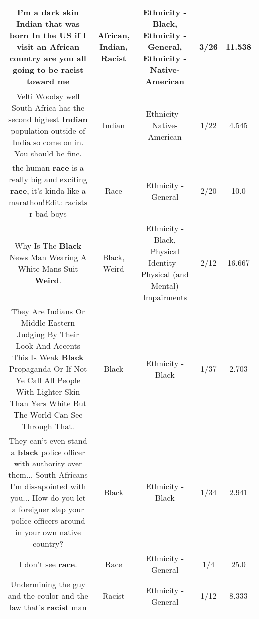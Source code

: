 \documentclass[11pt]{article}
\newlength\mylength
\begin{document}
\begin{center}
\begin{longtable}{|C{.65\mylength}|C{.30\mylength}|C{.12\mylength}|C{.12\mylength}|C{.12\mylength}|}
  \small I'm a dark skin \textbf{Indian} that was born In the US if I visit an \textbf{African} country are you all going to be \textbf{racist} toward me\normalsize   & African, Indian, Racist & Ethnicity - Black, Ethnicity - General, Ethnicity - Native-American & 3/26 & 11.538 \\  \hline
  \small Velti Woodsy well South Africa has the second highest \textbf{Indian} population outside of India so come on in. You should be fine.\normalsize   & Indian & Ethnicity - Native-American & 1/22 & 4.545 \\  \hline
  \small the human \textbf{race} is a really big and exciting \textbf{race}, it's kinda like a marathon!Edit: racists r bad boys\normalsize   & Race & Ethnicity - General & 2/20 & 10.0 \\  \hline
  \small Why Is The \textbf{Black} News Man Wearing A White Mans Suit \textbf{Weird}.\normalsize   & Black, Weird & Ethnicity - Black, Physical Identity - Physical (and Mental) Impairments & 2/12 & 16.667 \\  \hline
  \small They Are Indians Or Middle Eastern Judging By Their Look And Accents This Is Weak \textbf{Black} Propaganda Or If Not Ye Call All People With Lighter Skin Than Yers White But The World Can See Through That.\normalsize   & Black & Ethnicity - Black & 1/37 & 2.703 \\  \hline
  \small They can't even stand a \textbf{black} police officer with authority over them... South Africans I'm dissapointed with you... How do you let a foreigner slap your police officers around in your own native  country?\normalsize   & Black & Ethnicity - Black & 1/34 & 2.941 \\  \hline
  \small I don't see \textbf{race}.\normalsize   & Race & Ethnicity - General & 1/4 & 25.0 \\  \hline
  \small Undermining the guy and the coulor and the law that's \textbf{racist} man\normalsize   & Racist & Ethnicity - General & 1/12 & 8.333 \\  \hline

\end{longtable}
\end{center}
\end{document}
